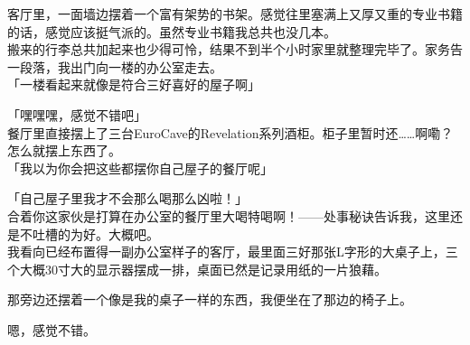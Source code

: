客厅里，一面墙边摆着一个富有架势的书架。感觉往里塞满上又厚又重的专业书籍的话，感觉应该挺气派的。虽然专业书籍我总共也没几本。\\

搬来的行李总共加起来也少得可怜，结果不到半个小时家里就整理完毕了。家务告一段落，我出门向一楼的办公室走去。\\

「一楼看起来就像是符合三好喜好的屋子啊」

「嘿嘿嘿，感觉不错吧」\\

餐厅里直接摆上了三台EuroCave的Revelation系列酒柜。柜子里暂时还……啊嘞？怎么就摆上东西了。\\

「我以为你会把这些都摆你自己屋子的餐厅呢」

「自己屋子里我才不会那么喝那么凶啦！」\\

合着你这家伙是打算在办公室的餐厅里大喝特喝啊！——处事秘诀告诉我，这里还是不吐槽的为好。大概吧。\\

我看向已经布置得一副办公室样子的客厅，最里面三好那张L字形的大桌子上，三个大概30寸大的显示器摆成一排，桌面已然是记录用纸的一片狼藉。

那旁边还摆着一个像是我的桌子一样的东西，我便坐在了那边的椅子上。

嗯，感觉不错。\\


